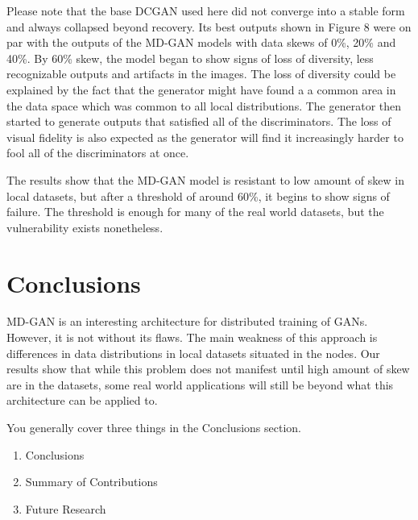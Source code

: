 \documentclass[11pt]{article}       %
\newcommand{\includeFig}[3]      {\begin{figure}[htb] \begin{center}
                                 \includegraphics
                                 [width=4in,keepaspectratio] %
                                 {#2}\caption{\label{#1}#3} \end{center} \end{figure}}
\begin{document}
Please note that the base DCGAN used here did not converge into a stable form and always collapsed beyond recovery. Its best outputs shown in Figure 8 were on par with the outputs of the MD-GAN models with data skews of 0\%, 20\% and 40\%. By 60\% skew, the model began to show signs of loss of diversity, less recognizable outputs and artifacts in the images. The loss of diversity could be explained by the fact that the generator might have found a a common area in the data space which was common to all local distributions. The generator then started to generate outputs that satisfied all of the discriminators. The loss of visual fidelity is also expected as the generator will find it increasingly harder to fool all of the discriminators at once.

The results show that the MD-GAN model is resistant to low amount of skew in local datasets, but after a threshold of around 60\%, it begins to show signs of failure. The threshold is enough for many of the real world datasets, but the vulnerability exists nonetheless. 





\section{Conclusions} \label{concl}

MD-GAN is an interesting architecture for distributed training of GANs. However, it is not without its flaws. The main weakness of this approach is differences in data distributions in local datasets situated in the nodes. Our results show that while this problem does not manifest until high amount of skew are in the datasets, some real world applications will still be beyond what this architecture can be applied to.

You generally cover three things in the Conclusions section.
\begin{enumerate}
\item Conclusions
\item Summary of Contributions
\item Future Research
\end{enumerate}
\end{document}
